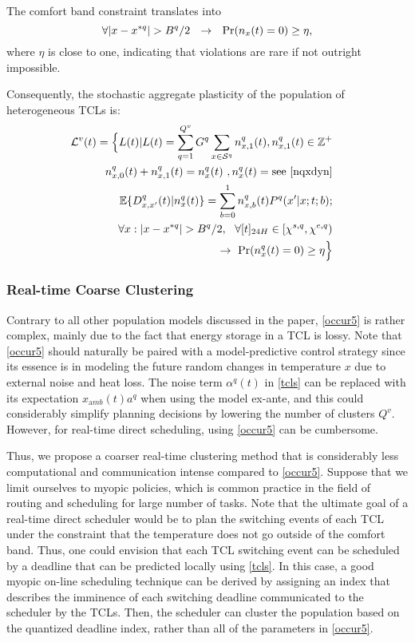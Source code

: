 \documentclass[10pt]{IEEEtran}
\begin{document}
The comfort band constraint translates into
\begin{equation}
\forall |x-x^{*q}|>B^q/2~~\rightarrow~~{\rm Pr}(n_x(t)=0)\geq \eta, 
\end{equation}
where $ \eta$ is close to one, indicating that violations are rare if not outright impossible. 

Consequently, the stochastic aggregate plasticity of the population of heterogeneous TCLs is:
  \begin{eqnarray} \label{occur5} 
{\mathcal L}^v(t) = \Big\{L(t) |  L(t) = \sum_{q=1}^{Q^v} G^q \sum_{x\in {\mathcal S}^q}n_{x,1}^q(t), n_{x,1}^q(t) \in \mathbb{Z}^+&&
\\~n_{x,0}^q(t) + n_{x,1}^q(t) = n_{x}^q(t)~, 
n^q_x(t)=\mbox{see \eqref{nqxdyn}}&&\nonumber\\
{\mathbb E}\{D_{x,x'}^q(t)|n^q_x(t)\}=\sum_{b=0}^1n_{x,b}^q(t)P^q(x'|x;t;b); &&\nonumber\\
\forall x: |x-x^{*q}|>B^q/2,~~\forall [t]_{24H}\in [\chi^{s,q},\chi^{e,q})&&\nonumber\\~~~~~~~~~~~~~~~~~~~~~~~~~\rightarrow~{\rm Pr}(n^q_x(t)=0)\geq \eta \Big\}  \nonumber&&
\end{eqnarray}




\subsubsection*{Real-time Coarse Clustering} Contrary to all other population models discussed in the paper, \eqref{occur5}  is rather complex, mainly due to the fact that energy storage in a TCL is lossy. Note that \eqref{occur5} should naturally be paired with a model-predictive control strategy since its essence is in modeling the future random changes in temperature $x$  due to external noise and heat loss.
The noise term $\alpha^q(t)$ in \eqref{tcls} can be replaced with its expectation $x_{{\mathrm amb}}(t)a^q$ when using the model ex-ante, and this could 
considerably simplify planning decisions by lowering the number of clusters $Q^v$.  However, for real-time direct scheduling, using \eqref{occur5} can be cumbersome.

Thus, we propose a coarser real-time clustering method that is considerably less computational and communication intense compared to \eqref{occur5}.
Suppose that we limit ourselves to myopic policies, which is common practice in the field of routing and scheduling for large number of tasks. Note that the ultimate goal of a real-time direct scheduler would be to plan the switching events of each TCL under the constraint that the temperature does not go outside of the comfort band. Thus, one could envision that each TCL switching event can be scheduled by a deadline that can be predicted locally using \eqref{tcls}. 
In this case, a good myopic on-line scheduling technique can be derived by assigning an index that describes the imminence of each switching deadline communicated to the scheduler by the TCLs.  Then, the scheduler can cluster the population based on the quantized deadline index, rather than all of the parameters
in \eqref{occur5}.  
\end{document}

